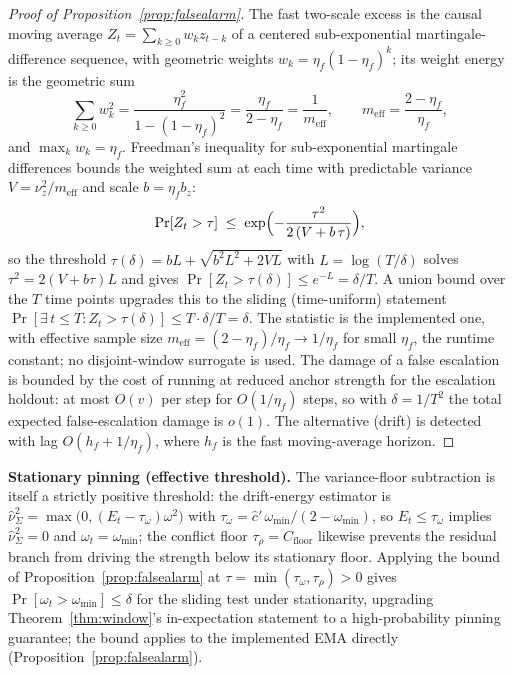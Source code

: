 \begin{proof}[Proof of Proposition~\ref{prop:falsealarm}]
The fast two-scale excess is the causal moving average $Z_t = \sum_{k\ge 0} w_k z_{t-k}$ of a centered sub-exponential martingale-difference sequence, with geometric weights $w_k = \eta_f(1-\eta_f)^k$; its weight energy is the geometric sum
\[
\sum_{k\ge 0} w_k^2 = \frac{\eta_f^2}{1-(1-\eta_f)^2} = \frac{\eta_f}{2-\eta_f} = \frac{1}{m_{\mathrm{eff}}},
\qquad m_{\mathrm{eff}} = \frac{2-\eta_f}{\eta_f},
\]
and $\max_k w_k = \eta_f$.
Freedman's inequality for sub-exponential martingale differences \citep{freedman1975} bounds the weighted sum at each time with predictable variance $V = \nu_z^2/m_{\mathrm{eff}}$ and scale $b = \eta_f b_z$:
\[
\Pr[Z_t > \tau] \;\le\; \exp\Bigl(-\frac{\tau^2}{2\,(V + b\,\tau)}\Bigr),
\]
so the threshold $\tau(\delta) = bL + \sqrt{b^2L^2 + 2VL}$ with $L = \log(T/\delta)$ solves $\tau^2 = 2(V + b\tau)L$ and gives $\Pr[Z_t > \tau(\delta)] \le e^{-L} = \delta/T$.
A union bound over the $T$ time points upgrades this to the sliding (time-uniform) statement $\Pr[\exists\, t \le T: Z_t > \tau(\delta)] \le T \cdot \delta/T = \delta$.
The statistic is the implemented one, with effective sample size $m_{\mathrm{eff}} = (2-\eta_f)/\eta_f \to 1/\eta_f$ for small $\eta_f$, the runtime constant; no disjoint-window surrogate is used.
The damage of a false escalation is bounded by the cost of running at reduced anchor strength for the escalation holdout: at most $O(v)$ per step for $O(1/\eta_f)$ steps, so with $\delta = 1/T^2$ the total expected false-escalation damage is $o(1)$.
The alternative (drift) is detected with lag $O(h_f + 1/\eta_f)$, where $h_f$ is the fast moving-average horizon.
\end{proof}

\medskip
\noindent\textbf{Stationary pinning (effective threshold).}
The variance-floor subtraction is itself a strictly positive threshold: the drift-energy estimator is $\widehat\nu^2_\Sigma=\max\bigl(0,(E_t-\tau_\omega)\omega^2\bigr)$ with $\tau_\omega=\hat c'\,\omega_{\min}/(2-\omega_{\min})$, so $E_t\le\tau_\omega$ implies $\widehat\nu^2_\Sigma=0$ and $\omega_t=\omega_{\min}$; the conflict floor $\tau_\rho=C_{\mathrm{floor}}$ likewise prevents the residual branch from driving the strength below its stationary floor.
Applying the bound of Proposition~\ref{prop:falsealarm} at $\tau=\min(\tau_\omega,\tau_\rho)>0$ gives $\Pr[\omega_t>\omega_{\min}]\le\delta$ for the sliding test under stationarity, upgrading Theorem~\ref{thm:window}'s in-expectation statement to a high-probability pinning guarantee; the bound applies to the implemented EMA directly (Proposition~\ref{prop:falsealarm}).

